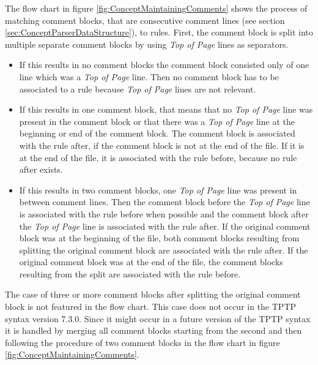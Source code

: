 The flow chart in figure \ref{fig:ConceptMaintainingComments} shows the process of matching comment blocks, that are consecutive comment lines (see section \ref{sec:ConceptParserDataStructure}),  to rules.
First, the comment block is split into multiple separate comment blocks by using \textit{Top of Page} lines as separators.
\begin{itemize}%
	\item If this results in no comment blocks the comment block consisted only of one line which was a \textit{Top of Page} line.
	Then no comment block has to be associated to a rule because \textit{Top of Page} lines are not relevant.
	\item If this results in one comment block, that means that no \textit{Top of Page} line was present in the comment block or that there was a \textit{Top of Page} line at the beginning or end of the comment block. The comment block is associated with the rule after, if the comment block is not at the end of the file.
	If it is at the end of the file, it is associated with the rule before, because no rule after exists.
	\item If this results in two comment blocks, one \textit{Top of Page} line was present in between comment lines.
	Then the comment block before the \textit{Top of Page} line is associated with the rule before when possible and the comment block after the \textit{Top of Page} line is associated with the rule after.
	If the original comment block was at the beginning of the file, both comment blocks resulting from splitting the original comment block are associated with the rule after.
	If the original comment block was at the end of the file, the comment blocks resulting from the split are associated with the rule before.
\end{itemize}
The case of three or more comment blocks after splitting the original comment block is not featured in the flow chart.
This case does not occur in the \ac{TPTP} syntax version 7.3.0.
Since it might occur in a future version of the \ac{TPTP} syntax it is handled by merging all comment blocks starting from the second and then following the procedure of two comment blocks in the flow chart in figure \ref{fig:ConceptMaintainingComments}.

